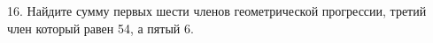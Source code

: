 16. Найдите сумму первых шести членов геометрической прогрессии, третий член который равен 54, а пятый 6.\\
